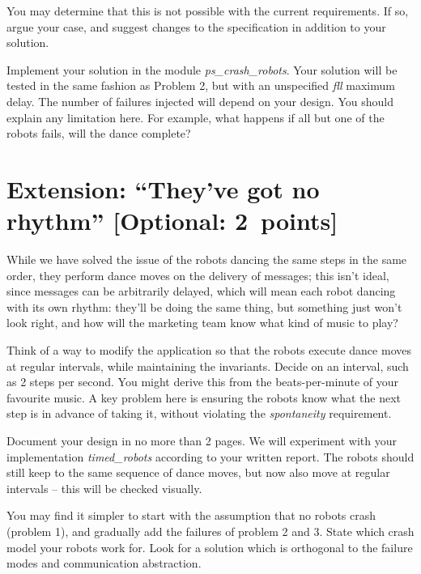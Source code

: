 \documentclass[a4paper]{article}
\begin{document}
You may determine that this is not possible with the
current requirements. If so, argue your case, and suggest changes to the
specification in addition to your solution.

Implement your solution in the module \emph{ps\_crash\_robots}.
Your solution will be tested in the same fashion as Problem 2, but with
an unspecified \emph{fll} maximum delay. The number of failures injected will
depend on your design. You should explain any limitation here. For example,
what happens if all but one of the robots fails, will the dance complete?












\section*{Extension: ``They've got no rhythm'' [Optional: 2~points]} %
\label{sec:buffered_dance_routine}

While we have solved the issue of the robots dancing the same steps in the
same order, they perform dance moves on the delivery of messages; this isn't
ideal, since messages can be arbitrarily delayed, which will mean each robot
dancing with its own rhythm: they'll be doing the same thing, but something
just won't look right, and how will the marketing team know what kind of music
to play?

Think of a way to modify the application so that the robots execute dance
moves at regular intervals, while maintaining the invariants. Decide on an
interval, such as 2 steps per second. You might derive this from the
beats-per-minute of your favourite music. A key problem here is ensuring the
robots know what the next step is in advance of taking it, without violating
the \emph{spontaneity} requirement.

Document your design in no more than 2 pages. We will experiment with your
implementation \emph{timed\_robots} according to your written report.
The robots should still keep to the same sequence of dance moves, but now also
move at regular intervals -- this will be checked visually.

You may find it simpler to start with the assumption that no robots crash
(problem 1), and gradually add the failures of problem 2 and 3. State which
crash model your robots work for. Look for a solution which is orthogonal to
the failure modes and communication abstraction.
\end{document}
